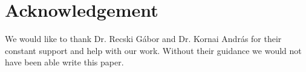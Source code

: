 \chapter{Acknowledgement}
We would like to thank Dr. Recski Gábor and Dr. Kornai András for their constant support and help with our work. Without their guidance we would not have been able write this paper.